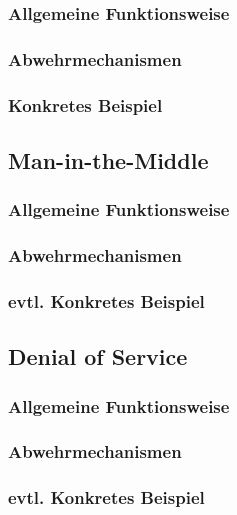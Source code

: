 \documentclass[11pt, a4paper]{article}
\begin{document}
\subsubsection{Allgemeine Funktionsweise}

\subsubsection{Abwehrmechanismen}

\subsubsection{Konkretes Beispiel}


\subsection{Man-in-the-Middle}

\subsubsection{Allgemeine Funktionsweise}

\subsubsection{Abwehrmechanismen}

\subsubsection{evtl. Konkretes Beispiel}


\subsection{Denial of Service}

\subsubsection{Allgemeine Funktionsweise}

\subsubsection{Abwehrmechanismen}

\subsubsection{evtl. Konkretes Beispiel}
\end{document}
